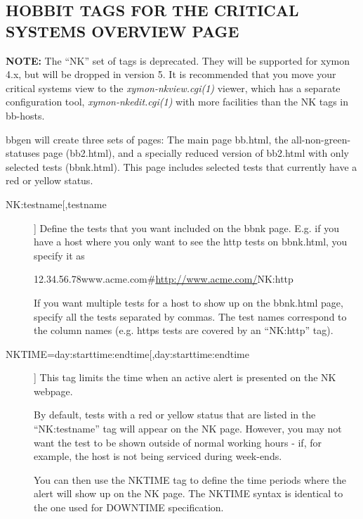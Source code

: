 \subsection{HOBBIT TAGS FOR THE CRITICAL SYSTEMS OVERVIEW PAGE}
\textbf{NOTE:}
 The ``NK'' set of tags is deprecated. They will be supported for
 xymon 4.x, but will be dropped in version 5. It is recommended that
 you move your critical systems view to the
 \emph{xymon-nkview.cgi(1)} viewer, which has a separate
 configuration tool, \emph{xymon-nkedit.cgi(1)} with more facilities
 than the NK tags in bb-hosts. 


 bbgen will create three sets of pages: The main page bb.html, the
 all-non-green-statuses page (bb2.html), and a specially reduced
 version of bb2.html with only selected tests (bbnk.html). This page
 includes selected tests that currently have a red or yellow status. 



 \begin{description}
\item[NK:testname[,testname]] Define the tests that you want included
  on the bbnk page. E.g. if you have a host where you only want to see
  the http tests on bbnk.html, you specify it as 


  
12.34.56.78www.acme.com\#\url{http://www.acme.com/}NK:http 


  If you want multiple tests for a host to show up on the bbnk.html
  page, specify all the tests separated by commas. The test names
  correspond to the column names (e.g. https tests are covered by an
  ``NK:http'' tag). 



\item[NKTIME=day:starttime:endtime[,day:starttime:endtime]] This tag limits the time when an active alert is presented on the NK webpage. 

  By default, tests with a red or yellow status that are listed in the
  ``NK:testname'' tag will appear on the NK page. However, you may not
  want the test to be shown outside of normal working hours - if, for
  example, the host is not being serviced during week-ends. 



  You can then use the NKTIME tag to define the time periods where the
  alert will show up on the NK page. The NKTIME syntax is identical to
  the one used for DOWNTIME specification. 


\end{description}

